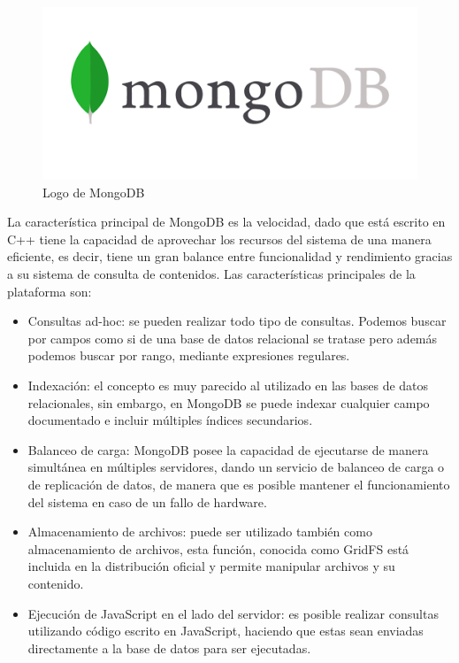 \begin{figure}[h]
    \centering
    \includegraphics[scale=0.2]{include/figuras/mongo.png}
    \caption{Logo de MongoDB}
    \label{fig:mongo}
\end{figure}

La característica principal de MongoDB es la velocidad, dado que está escrito en C++ tiene la capacidad de aprovechar los recursos del sistema de una manera eficiente, es decir, tiene un gran balance entre funcionalidad y rendimiento gracias a su sistema de consulta de contenidos. Las características principales de la plataforma son:

\begin{itemize}
    \item Consultas ad-hoc: se pueden realizar todo tipo de consultas. Podemos buscar por campos como si de una base de datos relacional se tratase pero además podemos buscar por rango, mediante expresiones regulares.
    \item Indexación: el concepto es muy parecido al utilizado en las bases de datos relacionales, sin embargo, en MongoDB se puede indexar cualquier campo documentado e incluir múltiples índices secundarios.
    \item Balanceo de carga: MongoDB posee la capacidad de ejecutarse de manera simultánea en múltiples servidores, dando un servicio de balanceo de carga o de replicación de datos, de manera que es posible mantener el funcionamiento del sistema en caso de un fallo de hardware.
    \item Almacenamiento de archivos: puede ser utilizado también como almacenamiento de archivos, esta función, conocida como GridFS está incluida en la distribución oficial y permite manipular archivos y su contenido.
    \item Ejecución de JavaScript en el lado del servidor: es posible realizar consultas utilizando código escrito en JavaScript, haciendo que estas sean enviadas directamente a la base de datos para ser ejecutadas.
\end{itemize}


